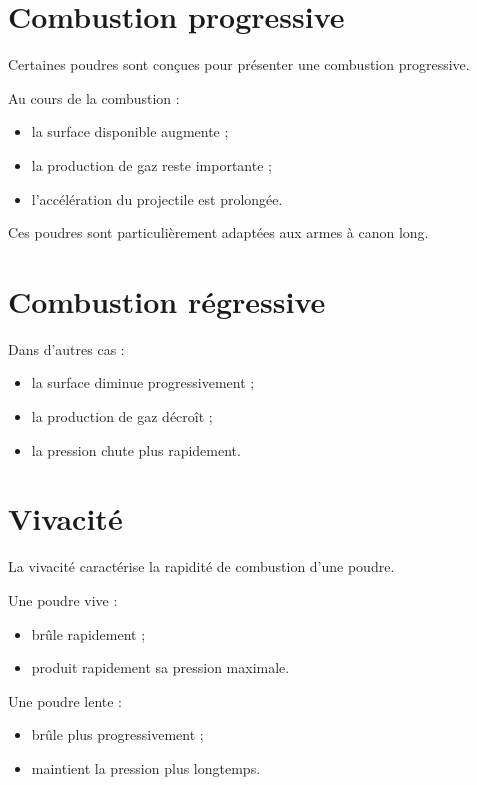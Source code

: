 \section{Combustion progressive}

Certaines poudres sont conçues pour présenter une combustion progressive.

Au cours de la combustion :

\begin{itemize}
    \item la surface disponible augmente ;
    \item la production de gaz reste importante ;
    \item l'accélération du projectile est prolongée.
\end{itemize}

Ces poudres sont particulièrement adaptées aux armes à canon long.

\section{Combustion régressive}

Dans d'autres cas :

\begin{itemize}
    \item la surface diminue progressivement ;
    \item la production de gaz décroît ;
    \item la pression chute plus rapidement.
\end{itemize}

\section{Vivacité}

La vivacité caractérise la rapidité de combustion d'une poudre.

Une poudre vive :

\begin{itemize}
    \item brûle rapidement ;
    \item produit rapidement sa pression maximale.
\end{itemize}

Une poudre lente :

\begin{itemize}
    \item brûle plus progressivement ;
    \item maintient la pression plus longtemps.
\end{itemize}

